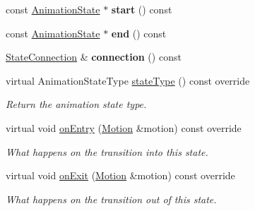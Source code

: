 \begin{Indent}
\begin{DoxyCompactItemize}
const \mbox{\hyperlink{classrev_1_1_animation_state}{Animation\+State}} $\ast$ {\bfseries start} () const
\item 
\mbox{\label{classrev_1_1_animation_transition_a0274c16a033b6517f99968b34f65c228}} 
const \mbox{\hyperlink{classrev_1_1_animation_state}{Animation\+State}} $\ast$ {\bfseries end} () const
\item 
\mbox{\label{classrev_1_1_animation_transition_afe908df5c5a331ee116956275fb452e2}} 
\mbox{\hyperlink{classrev_1_1_state_connection}{State\+Connection}} \& {\bfseries connection} () const
\item 
\mbox{\label{classrev_1_1_animation_transition_a6b344cdfaeafe3d3c803b8cfa50b745e}} 
virtual Animation\+State\+Type \mbox{\hyperlink{classrev_1_1_animation_transition_a6b344cdfaeafe3d3c803b8cfa50b745e}{state\+Type}} () const override
\begin{DoxyCompactList}\small\item\em Return the animation state type. \end{DoxyCompactList}\item 
\mbox{\label{classrev_1_1_animation_transition_aadb757b2641ac8dc49a4fa158c3740ad}} 
virtual void \mbox{\hyperlink{classrev_1_1_animation_transition_aadb757b2641ac8dc49a4fa158c3740ad}{on\+Entry}} (\mbox{\hyperlink{classrev_1_1_motion}{Motion}} \&motion) const override
\begin{DoxyCompactList}\small\item\em What happens on the transition into this state. \end{DoxyCompactList}\item 
\mbox{\label{classrev_1_1_animation_transition_ab148167c2a64d9de728238b15505b57d}} 
virtual void \mbox{\hyperlink{classrev_1_1_animation_transition_ab148167c2a64d9de728238b15505b57d}{on\+Exit}} (\mbox{\hyperlink{classrev_1_1_motion}{Motion}} \&motion) const override
\begin{DoxyCompactList}\small\item\em What happens on the transition out of this state. \end{DoxyCompactList}\end{DoxyCompactItemize}
\end{Indent}
